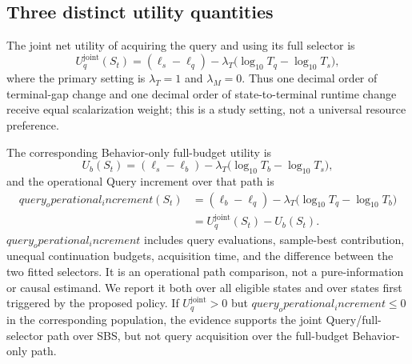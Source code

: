 \subsection{Three distinct utility quantities}

The joint net utility of acquiring the query and using its full selector is
\begin{equation}
  U_q^{\mathrm{joint}}(S_t)
  =(\ell_s-\ell_q)
  -\lambda_T\bigl(\log_{10}T_q-\log_{10}T_s\bigr),
  \label{eq:query-utility}
\end{equation}
where the primary setting is $\lambda_T=1$ and $\lambda_M=0$.  Thus one decimal
order of terminal-gap change and one decimal order of state-to-terminal runtime
change receive equal scalarization weight; this is a study setting, not a
universal resource preference.

The corresponding Behavior-only full-budget utility is
\begin{equation}
  U_b(S_t)
  =(\ell_s-\ell_b)
  -\lambda_T\bigl(\log_{10}T_b-\log_{10}T_s\bigr),
  \label{eq:behavior-utility}
\end{equation}
and the operational Query increment over that path is
\begin{align}
  query_operational_increment(S_t)
  &=(\ell_b-\ell_q)
  -\lambda_T\bigl(\log_{10}T_q-\log_{10}T_b\bigr)\\
  &=U_q^{\mathrm{joint}}(S_t)-U_b(S_t).
  \label{eq:operational-increment}
\end{align}
$query_operational_increment$ includes query evaluations, sample-best contribution, unequal
continuation budgets, acquisition time, and the difference between the two
fitted selectors.  It is an operational path comparison, not a
pure-information or causal estimand.  We report it both over all eligible
states and over states first triggered by the proposed policy.  If
$U_q^{\mathrm{joint}}>0$ but $query_operational_increment\leq0$ in the corresponding population, the
evidence supports the joint Query/full-selector path over SBS, but not query
acquisition over the full-budget Behavior-only path.

